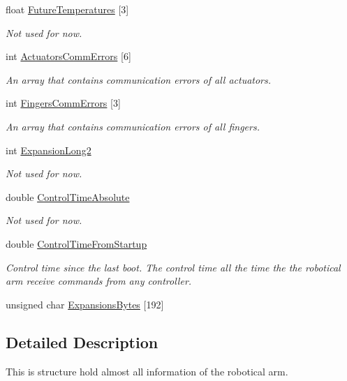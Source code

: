 \begin{DoxyCompactItemize}
float \hyperlink{struct_general_informations_a9acf6d8134ee89b7de200ca863d46d94}{Future\+Temperatures} \mbox{[}3\mbox{]}
\begin{DoxyCompactList}\small\item\em Not used for now. \end{DoxyCompactList}\item 
int \hyperlink{struct_general_informations_a7281486ac36892c876e30962656660ee}{Actuators\+Comm\+Errors} \mbox{[}6\mbox{]}
\begin{DoxyCompactList}\small\item\em An array that contains communication errors of all actuators. \end{DoxyCompactList}\item 
int \hyperlink{struct_general_informations_a2a65ca5c2039e398982814e0a2c0e862}{Fingers\+Comm\+Errors} \mbox{[}3\mbox{]}
\begin{DoxyCompactList}\small\item\em An array that contains communication errors of all fingers. \end{DoxyCompactList}\item 
int \hyperlink{struct_general_informations_abc8962194d7c8b514be5c28d99b6b4a3}{Expansion\+Long2}
\begin{DoxyCompactList}\small\item\em Not used for now. \end{DoxyCompactList}\item 
double \hyperlink{struct_general_informations_a8f91e2c0ca1565c5f3478923b9885389}{Control\+Time\+Absolute}
\begin{DoxyCompactList}\small\item\em Not used for now. \end{DoxyCompactList}\item 
double \hyperlink{struct_general_informations_aa38f3afead9da07799c45bca401037eb}{Control\+Time\+From\+Startup}
\begin{DoxyCompactList}\small\item\em Control time since the last boot. The control time all the time the the robotical arm receive commands from any controller. \end{DoxyCompactList}\item 
unsigned char \hyperlink{struct_general_informations_a79fda6f821bd29109818f22bfc4167b5}{Expansions\+Bytes} \mbox{[}192\mbox{]}
\end{DoxyCompactItemize}


\subsection{Detailed Description}
This is structure hold almost all information of the robotical arm. 

